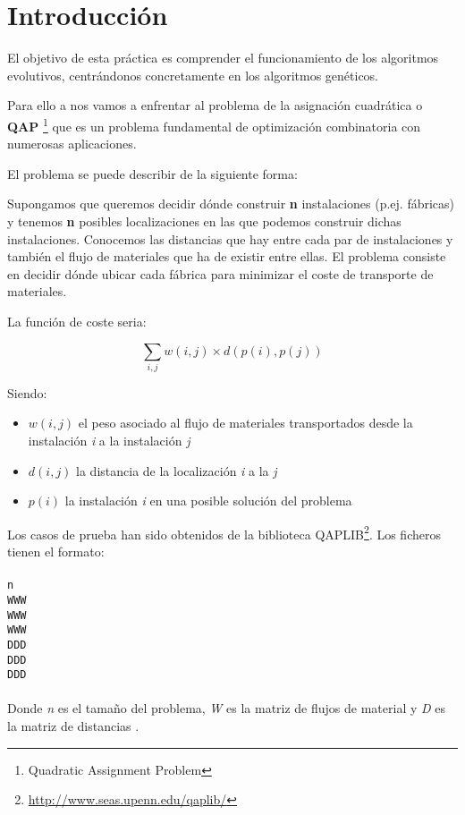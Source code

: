 \chapter{Introducción}

El objetivo de esta práctica es comprender el funcionamiento de los algoritmos evolutivos, centrándonos concretamente en los algoritmos genéticos. 

\bigskip
Para ello a nos vamos a enfrentar al problema de la asignación cuadrática o \textbf{QAP} \footnote{Quadratic Assignment Problem} que es un problema fundamental de optimización combinatoria con numerosas aplicaciones. 

\bigskip
El problema se puede describir de la siguiente forma:

\bigskip
Supongamos que queremos decidir dónde construir \textbf{n} instalaciones (p.ej. fábricas) y tenemos \textbf{n} posibles localizaciones en las que podemos construir dichas instalaciones. Conocemos las distancias que hay entre cada par de instalaciones y también el flujo de materiales que ha de existir entre ellas. El problema consiste en decidir dónde ubicar cada fábrica para minimizar el coste de transporte de materiales.

\bigskip
La función de coste seria:

\[ \sum_{i,j} w(i,j) \times d(p(i),p(j)) \]

Siendo:

\begin{itemize}
	\item $ w(i,j) $ el peso asociado al flujo de materiales transportados desde la instalación \textit{i} a la instalación \textit{j}
	\item $ d(i,j) $ la distancia de la localización \textit{i} a la \textit{j}
	\item $ p(i) $ la instalación \textit{i} en una posible solución del problema
\end{itemize}

\bigskip
Los casos de prueba han sido obtenidos de la biblioteca QAPLIB\footnote{\url{http://www.seas.upenn.edu/qaplib/}}. Los ficheros tienen el  formato:
\\ \\
\texttt{n}
\\
\texttt{WWW}\\
\texttt{WWW}\\
\texttt{WWW}
\\
\texttt{DDD}\\
\texttt{DDD}\\
\texttt{DDD}
\\ \\
Donde \textit{n} es el tamaño del problema, \textit{W} es la matriz de flujos de material y \textit{D} es la matriz de distancias .

